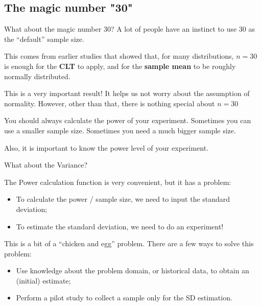 \subsection{The magic number "30"}

\begin{frame}{What about the magic number 30?}{}
  A lot of people have an instinct to use 30 as the ``default'' sample
  size.\bigskip

  This comes from earlier studies that showed that, for many
  distributions, $n = 30$ is enough for the {\bf CLT} to apply, and
  for the {\bf sample mean} to be roughly normally distributed.\bigskip

  This is a very important result! It helps us not worry about the
  assumption of normality. However, other than that, there is nothing
  special about $n=30$\bigskip

  You should always calculate the power of your experiment. Sometimes
  you can use a smaller sample size. Sometimes you need a much bigger sample size.\bigskip

  \alert{Also, it is important to know the power level of your experiment}.  
\end{frame}

\begin{frame}{What about the Variance?}

The Power calculation function is very convenient, but it has a
problem:
\begin{itemize}
\item To calculate the power / sample size, we need to input the standard deviation;
\item To estimate the standard deviation, we need to do an experiment!
\end{itemize}\bigskip

This is a bit of a ``chicken and egg'' problem. There are a few ways to solve this problem:
\begin{itemize}
\item Use knowledge about the problem domain, or historical data, to
  obtain an (initial) estimate;
\item Perform a pilot study to collect a sample only for the SD estimation.
\end{itemize}\bigskip
\end{frame}

